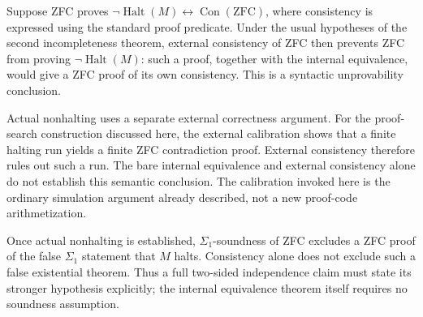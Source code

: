 Suppose ZFC proves
$\neg\operatorname{Halt}(M)\leftrightarrow\operatorname{Con}(\mathrm{ZFC})$,
where consistency is expressed using the standard proof predicate.
Under the usual hypotheses of the second incompleteness theorem, external
consistency of ZFC then prevents ZFC from proving
$\neg\operatorname{Halt}(M)$: such a proof, together with the internal
equivalence, would give a ZFC proof of its own consistency.  This is a
syntactic unprovability conclusion.

Actual nonhalting uses a separate external correctness argument.  For the
proof-search construction discussed here, the external calibration shows
that a finite halting run yields a finite ZFC contradiction proof.
External consistency therefore rules out such a run.  The bare internal
equivalence and external consistency alone do not establish this semantic
conclusion.  The calibration invoked here is the ordinary simulation
argument already described, not a new proof-code arithmetization.

Once actual nonhalting is established, $\Sigma_1$-soundness of ZFC excludes
a ZFC proof of the false $\Sigma_1$ statement that $M$ halts.  Consistency
alone does not exclude such a false existential theorem.  Thus a full
two-sided independence claim must state its stronger hypothesis
explicitly; the internal equivalence theorem itself requires no
soundness assumption.
